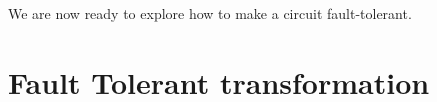 \documentclass[12pt]{report}
\begin{document}
We are now ready to explore how to make a circuit fault-tolerant.

\section{Fault Tolerant transformation}
\end{document}
